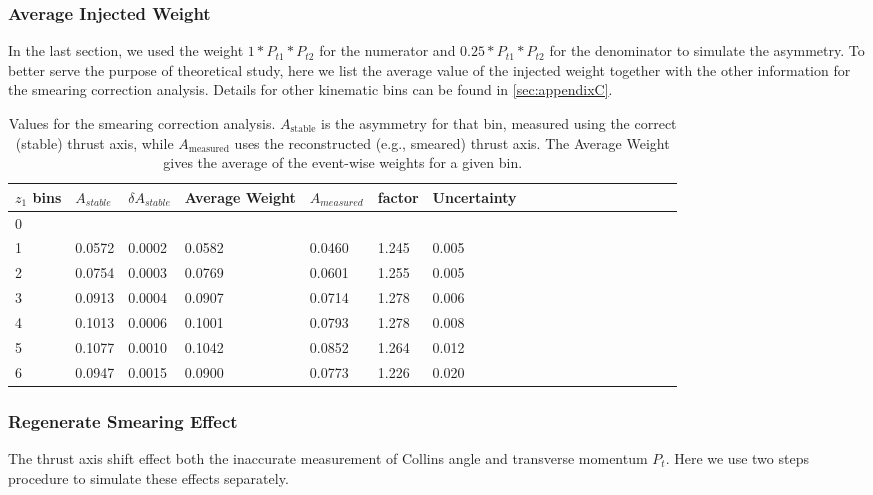 \subsubsection{Average Injected Weight}
In the last section, we used the weight $1*P_{t1}*P_{t2}$ for the numerator and $0.25*P_{t1}*P_{t2}$ for the denominator to simulate the asymmetry. To better serve the purpose of theoretical study, here we list the average value of the injected weight together with the other information for the smearing correction analysis. Details for other kinematic bins can be found in \ref{sec:appendixC}.
\begin{table}[H]\footnotesize
\centering
\begin{tabular}{|l|l|l|l|l|l|l|l|l|l|l|l|l|l|l|l|l|l|}
\hline
$z_1$ bins & $A_{stable}$ & $\delta A_{stable}$ & Average Weight &  $A_{measured}$ & factor  & Uncertainty\\ \hline
0	&		&		&		&		&		&		\\ \hline
1	&	0.0572	&	0.0002	&	0.0582	&	0.0460	&	1.245	&	0.005	\\ \hline
2	&	0.0754	&	0.0003	&	0.0769	&	0.0601	&	1.255	&	0.005	\\ \hline
3	&	0.0913	&	0.0004	&	0.0907	&	0.0714	&	1.278	&	0.006	\\ \hline
4	&	0.1013	&	0.0006	&	0.1001	&	0.0793	&	1.278	&	0.008	\\ \hline
5	&	0.1077	&	0.0010	&	0.1042	&	0.0852	&	1.264	&	0.012	\\ \hline
6	&	0.0947	&	0.0015	&	0.0900	&	0.0773	&	1.226	&	0.020	\\ \hline
\end{tabular}
\caption{Values for the smearing correction analysis. $A_\textrm{stable}$ is the asymmetry for that bin, measured using the correct 
(stable) thrust axis, while $A_\textrm{measured}$ uses the reconstructed 
(e.g., smeared) thrust axis. The Average Weight gives the average of 
the event-wise weights for a given bin.
\label{tab:sinz_smearing_info}}
\end{table}

\iffalse
\subsubsection{\texorpdfstring{Regenerate Smearing Effect}{Regenerated Smearing Effect}} 
\label{sec:regeneratedsmearing}
The thrust axis shift effect both the inaccurate measurement of Collins angle and transverse momentum $P_t$. Here we use two steps procedure to simulate these effects separately.

